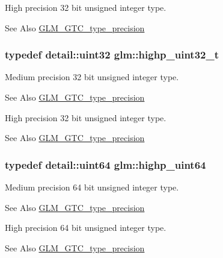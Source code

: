 High precision 32 bit unsigned integer type. \begin{DoxySeeAlso}{See Also}
\hyperlink{group__gtc__type__precision}{G\-L\-M\-\_\-\-G\-T\-C\-\_\-type\-\_\-precision} 
\end{DoxySeeAlso}
\hypertarget{group__gtc__type__precision_ga8eb85ad460079c63b68866ae34637bda}{
\subsubsection[{highp\-\_\-uint32\-\_\-t}]{\setlength{\rightskip}{0pt plus 5cm}typedef detail\-::uint32 {\bf glm\-::highp\-\_\-uint32\-\_\-t}}}\label{group__gtc__type__precision_ga8eb85ad460079c63b68866ae34637bda}
Medium precision 32 bit unsigned integer type. \begin{DoxySeeAlso}{See Also}
\hyperlink{group__gtc__type__precision}{G\-L\-M\-\_\-\-G\-T\-C\-\_\-type\-\_\-precision}
\end{DoxySeeAlso}
High precision 32 bit unsigned integer type. \begin{DoxySeeAlso}{See Also}
\hyperlink{group__gtc__type__precision}{G\-L\-M\-\_\-\-G\-T\-C\-\_\-type\-\_\-precision} 
\end{DoxySeeAlso}
\hypertarget{group__gtc__type__precision_ga8079c653e20cda03d34b99de629a7b09}{
\subsubsection[{highp\-\_\-uint64}]{\setlength{\rightskip}{0pt plus 5cm}typedef detail\-::uint64 {\bf glm\-::highp\-\_\-uint64}}}\label{group__gtc__type__precision_ga8079c653e20cda03d34b99de629a7b09}
Medium precision 64 bit unsigned integer type. \begin{DoxySeeAlso}{See Also}
\hyperlink{group__gtc__type__precision}{G\-L\-M\-\_\-\-G\-T\-C\-\_\-type\-\_\-precision}
\end{DoxySeeAlso}
High precision 64 bit unsigned integer type. \begin{DoxySeeAlso}{See Also}
\hyperlink{group__gtc__type__precision}{G\-L\-M\-\_\-\-G\-T\-C\-\_\-type\-\_\-precision} 
\end{DoxySeeAlso}
